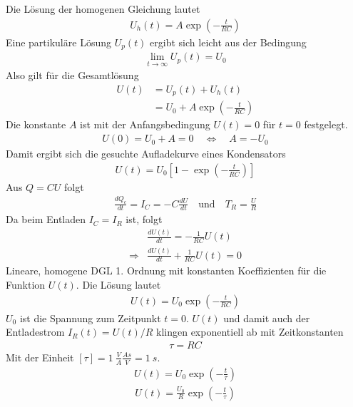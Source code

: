 \documentclass{scrartcl}
\begin{document}
\noindent Die Lösung der homogenen Gleichung lautet 
\begin{align}
    U_h(t)=A\exp\left(-\frac{t}{RC}\right)
\end{align}
Eine partikuläre Lösung $U_p(t)$ ergibt sich leicht aus der Bedingung
\begin{align}
    \lim_{t\to\infty} U_p(t)=U_0
\end{align}
Also gilt für die Gesamtlösung
\begin{align}
    U(t)&=U_p(t)+U_h(t)\\
    &=U_0+A\exp\left(-\frac{t}{RC}\right)
\end{align}
Die konstante $A$ ist mit der Anfangsbedingung $U(t)=0$ für
$t=0$ festgelegt.
\begin{align}
    U(0)=U_0+A=0\quad \Leftrightarrow \quad A=-U_0
\end{align}
Damit ergibt sich die gesuchte Aufladekurve eines Kondensators
\begin{align}
    U(t)=U_0\left[1-\exp\left(-\frac{t}{RC}\right)\right]
\end{align}
Aus $Q=CU$ folgt
\begin{align}
    \frac{dQ_c}{dt}=I_C=-C\frac{dU}{dt} \quad \text{und}\quad T_R=\frac{U}{R}
\end{align}
Da beim Entladen $I_C=I_R$ ist, folgt
\begin{align}
    &\frac{dU(t)}{dt}=-\frac{1}{RC}U(t)\\
    \Rightarrow &\frac{dU(t)}{dt}+\frac{1}{RC}U(t)=0
\end{align}
Lineare, homogene DGL 1. Ordnung mit konstanten Koeffizienten
für die Funktion $U(t)$. Die Lösung lautet 
\begin{align}
    U(t)=U_0\exp\left(-\frac{t}{RC}\right)
\end{align}
$U_0$ ist die Spannung zum Zeitpunkt $t=0$. $U(t)$ und damit auch der Entladestrom
$I_R(t)=U(t)/R$ klingen exponentiell ab mit Zeitkonstanten
\begin{align}
    \tau=RC
\end{align}
Mit der Einheit $[\tau]=\SI{1}{\frac{V}{A}\frac{A s}{V}}=\SI{1}{s}$.
\begin{align}
    U(t)=U_0\exp\left(-\frac{t}{\tau}\right)
\end{align}
\begin{align}
    U(t)=\frac{U_0}{R}\exp\left(-\frac{t}{\tau}\right)
\end{align}




\end{document}
